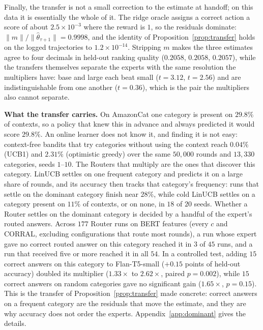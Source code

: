 \documentclass{article}
\theoremstyle{definition}
\theoremstyle{remark}
\theoremstyle{remark}
\begin{document}
Finally, the transfer is not a small correction to the estimate at handoff; on
this data it is essentially the whole of it. The ridge oracle assigns a
correct action a score of about $2.5\times10^{-3}$ where the reward is $1$, so
the residuals dominate: $\|m\|/\|\widehat\theta_{\tau+1}\|=0.9998$, and the
identity of Proposition~\ref{prop:transfer} holds on the logged trajectories
to $1.2\times10^{-14}$. Stripping $m$ makes the three estimates agree to four
decimals in held-out ranking quality ($0.2058$, $0.2058$, $0.2057$), while the
transfers themselves separate the experts with the same resolution the
multipliers have: base and large each beat small ($t=3.12$, $t=2.56$) and are
indistinguishable from one another ($t=0.36$), which is the pair the
multipliers also cannot separate.

\textbf{What the transfer carries.} On AmazonCat one category is present on
$29.8\%$ of contexts, so a policy that knew this in advance and always
predicted it would score $29.8\%$. An online learner does not know it, and
finding it is not easy: context-free bandits that try categories without
using the context reach $0.04\%$ (UCB1) and $2.31\%$ (optimistic greedy) over
the same $50{,}000$ rounds and $13{,}330$ categories, seeds $1$--$10$. The
Routers that multiply are the ones that discover this category. LinUCB
settles on one frequent category and predicts it on a large share of rounds,
and its accuracy then tracks that category's frequency: runs that settle on
the dominant category finish near $28\%$, while cold LinUCB settles on a
category present on $11\%$ of contexts, or on none, in $18$ of $20$ seeds.
Whether a Router settles on the dominant category is decided by a handful of
the expert's routed answers. Across $177$ Router runs on BERT features (every
$c$ and CORRAL, excluding configurations that route most rounds), a run whose
expert gave no correct routed answer on this category reached it in $3$ of
$45$ runs, and a run that received five or more reached it in all $54$. In a
controlled test, adding $15$ correct answers on this category to
Flan-T5-small ($+0.15$ points of held-out accuracy) doubled its multiplier
($1.33\times$ to $2.62\times$, paired $p=0.002$), while $15$ correct answers on
random categories gave no significant gain ($1.65\times$, $p=0.15$). This is
the transfer of Proposition~\ref{prop:transfer} made concrete: correct answers
on a frequent category are the residuals that move the estimate, and they are
why accuracy does not order the experts. Appendix~\ref{app:dominant} gives the
details.
\end{document}
